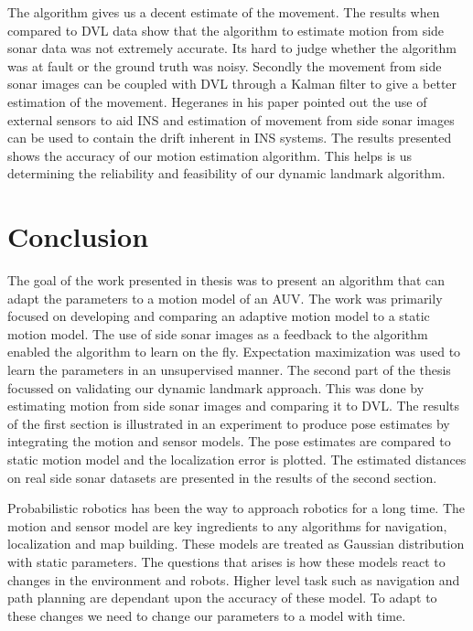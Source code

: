 \documentclass[12pt]{dalcsthesis}
\begin{document}
The algorithm gives us a decent estimate of the movement. The results when compared to DVL data show that the algorithm to estimate motion from side sonar data was not extremely accurate. Its hard to judge whether the algorithm was at fault or the ground truth was noisy. Secondly the movement from side sonar images can be coupled with DVL through a Kalman filter to give a better estimation of the movement. Hegeranes \cite{} in his paper pointed out the use of external sensors to aid INS and estimation of movement from side sonar images can be used to contain the drift inherent in INS systems. 
The results presented shows the accuracy of our motion estimation algorithm. This helps is us determining the reliability and feasibility of our dynamic landmark algorithm.   
\chapter{Conclusion}
The goal of the work presented in thesis was to present an algorithm that can adapt the parameters to a motion model of an AUV. The work was primarily focused on developing and comparing an adaptive motion model to a static motion model. The use of side sonar images as a feedback to the algorithm enabled the algorithm to learn on the fly. Expectation maximization was used to learn the parameters in an unsupervised manner. The second part of the thesis focussed on validating our dynamic landmark approach. This was done by estimating motion from side sonar images and comparing it to DVL. The results of the first section is illustrated in an experiment to produce pose estimates by integrating the motion and sensor models. The pose estimates are compared to static motion model and the localization error is plotted. The estimated distances on real side sonar datasets are presented in the results of the second section.

Probabilistic robotics has been the way to approach robotics for a long time. The motion and sensor model are key ingredients to any algorithms for navigation, localization and map building. These models are treated as Gaussian distribution with static parameters. The questions that arises is how these models react to changes in the environment and robots. Higher level task such as navigation and path planning are dependant upon the accuracy of these model. To adapt to these changes we need to change our parameters to a model with time.
\end{document}
